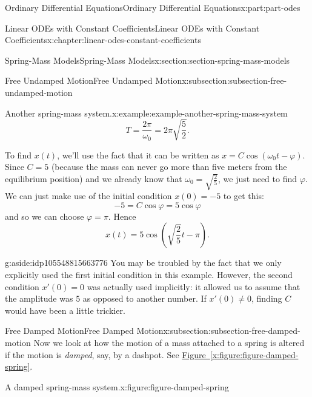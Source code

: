 \documentclass[twoside,10pt,]{book}
\newcommand{\xreffont}{\relax}
\numberwithin{equation}{part}
\begin{document}
\begin{partptx}{Ordinary Differential Equations}{}{Ordinary Differential Equations}{}{}{x:part:part-odes}
\begin{chapterptx}{Linear ODEs with Constant Coefficients}{}{Linear ODEs with Constant Coefficients}{}{}{x:chapter:linear-odes-constant-coefficients}
\begin{sectionptx}{Spring-Mass Models}{}{Spring-Mass Models}{}{}{x:section:section-spring-mass-models}
\begin{subsectionptx}{Free Undamped Motion}{}{Free Undamped Motion}{}{}{x:subsection:subsection-free-undamped-motion}
\begin{example}{Another spring-mass system.}{x:example:example-another-spring-mass-system}
\begin{equation*}
T = \frac{2\pi}{\omega_{0}} = 2\pi\sqrt{\frac{5}{2}}.
\end{equation*}
%
\par
To find \(x(t)\), we'll use the fact that it can be written as \(x = C\cos(\omega_{0}t-\varphi)\). Since \(C = 5\) (because the mass can never go more than five meters from the equilibrium position) and we already know that \(\omega_{0} = \sqrt{\frac{2}{5}}\), we just need to find \(\varphi\). We can just make use of the initial condition \(x(0) = -5\) to get this:%
\begin{equation*}
-5 = C\cos\varphi = 5\cos\varphi
\end{equation*}
and so we can choose \(\varphi=\pi\). Hence%
\begin{equation*}
x(t) = 5\cos(\sqrt{\frac{2}{5}}t-\pi).
\end{equation*}
%
\end{example}
\begin{aside}{}{g:aside:idp105548815663776}%
You may be troubled by the fact that we only explicitly used the first initial condition in this example. However, the second condition \(x'(0) = 0\) was actually used implicitly: it allowed us to assume that the amplitude was \(5\) as opposed to another number. If \(x'(0)\neq0\), finding \(C\) would have been a little trickier.%
\end{aside}
\end{subsectionptx}
%
%
\typeout{************************************************}
\typeout{************************************************}
%
\begin{subsectionptx}{Free Damped Motion}{}{Free Damped Motion}{}{}{x:subsection:subsection-free-damped-motion}
Now we look at how the motion of a mass attached to a spring is altered if the motion is \emph{damped}, say, by a dashpot. See \hyperref[x:figure:figure-damped-spring]{Figure~{\xreffont\ref{x:figure:figure-damped-spring}}}.%
\begin{figureptx}{A damped spring-mass system.}{x:figure:figure-damped-spring}{}%
\begin{image}{0}{1}{0}%
\end{image}
\end{figureptx}
\end{subsectionptx}
\end{sectionptx}
\end{chapterptx}
\end{partptx}
\end{document}
